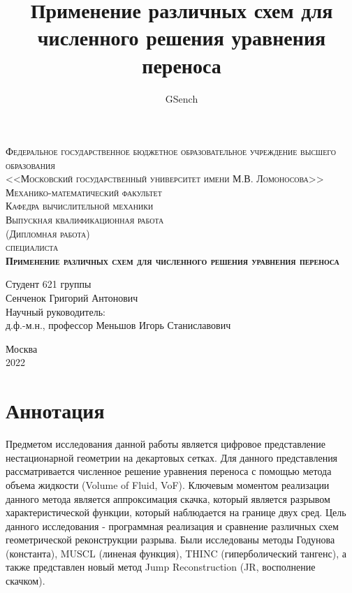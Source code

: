 \documentclass[12pt,a4paper]{article}
\author{GSench}
\title{Применение различных схем для численного решения уравнения переноса}
\begin{document}
\begin{titlepage}

\begin{center}
\textsc{Федеральное государственное бюджетное образовательное учреждение высшего образования\\
<<Московский государственный университет имени М.В. Ломоносова>>}\\
\vspace{12pt}
\textsc{Механико-математический факультет}\\
\textsc{Кафедра вычислительной механики}\\

\vspace*{\fill}
\textsc{Выпускная квалификационная работа\\
(Дипломная работа)\\
специалиста}\\
\vspace{12pt}
\textsc{\textbf{Применение различных схем для численного решения уравнения переноса}}\\
\vspace*{\fill}

\end{center}

\begin{flushright}
Студент 621 группы \\
Сенченок Григорий Антонович\\
\vspace{10pt}
Научный руководитель: \\
д.ф.-м.н., профессор Меньшов Игорь Станиславович
\end{flushright}

\mbox{}
\vfill
\begin{center}
Москва\\[5pt]
2022
\end{center}

\end{titlepage}

\tableofcontents

\newpage

\section{Аннотация}
Предметом исследования данной работы является цифровое представление нестационарной геометрии на декартовых сетках.
Для данного представления рассматривается численное решение уравнения переноса с помощью метода объема жидкости (Volume of Fluid, VoF). Ключевым моментом реализации данного метода является аппроксимация скачка, который является разрывом характеристической функции, который наблюдается на границе двух сред.
Цель данного исследования - программная реализация и сравнение различных схем геометрической реконструкции разрыва. Были исследованы методы Годунова (константа), MUSCL (линеная функция), THINC (гиперболический тангенс), а также представлен новый метод Jump Reconstruction (JR, восполнение скачком).
\end{document}
